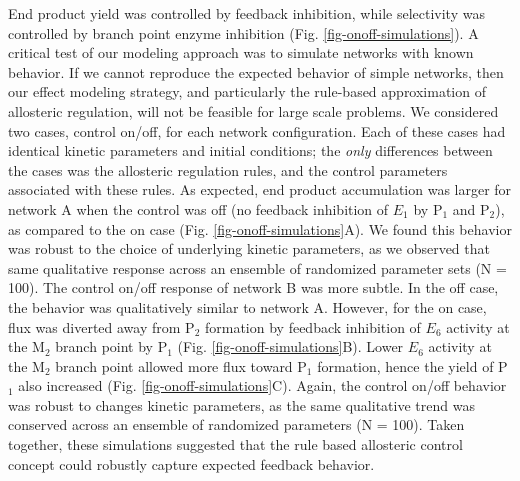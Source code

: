 \documentclass[12pt]{article}
\begin{document}
End product yield was controlled by feedback inhibition, while selectivity was controlled by branch point enzyme inhibition (Fig. \ref{fig-onoff-simulations}).
A critical test of our modeling approach was to simulate networks with known behavior. If we cannot reproduce the expected behavior of simple networks, then our
effect modeling strategy, and particularly the rule-based approximation of allosteric regulation, will not be feasible for large scale problems.
We considered two cases,  control on/off, for each network configuration. 
Each of these cases had identical kinetic parameters and initial conditions; 
the \textit{only} differences between the cases was the allosteric regulation rules, and the control parameters associated with these rules. 
As expected, end product accumulation was larger for network A when the control was off (no feedback inhibition of $E_{1}$ by P$_{1}$ and P$_{2}$),
as compared to the on case (Fig. \ref{fig-onoff-simulations}A). We found this behavior was robust to the choice of underlying kinetic parameters, 
as we observed that same qualitative response across an ensemble of randomized parameter sets (N = 100). 
The control on/off response of network B was more subtle. In the off case, the behavior was qualitatively similar to network A. 
However, for the on case, flux was diverted away from P$_{2}$ formation by feedback inhibition of $E_{6}$ activity at the M$_{2}$ branch point by P$_{1}$ (Fig. \ref{fig-onoff-simulations}B).
Lower $E_{6}$ activity at the M$_{2}$ branch point allowed more flux toward P$_{1}$ formation, hence the yield of P$_{1}$ also increased (Fig. \ref{fig-onoff-simulations}C).
Again, the control on/off behavior was robust to changes kinetic parameters, as the same qualitative trend was conserved across 
an ensemble of randomized parameters (N = 100). Taken together, these simulations suggested that the rule based allosteric control 
concept could robustly capture expected feedback behavior.
\end{document}
